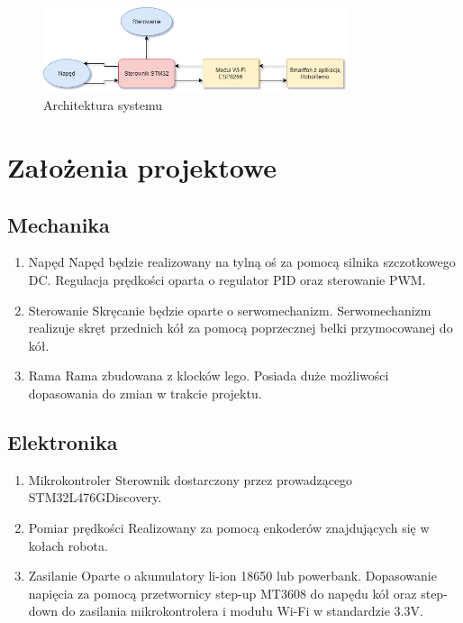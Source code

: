 \documentclass[10pt, a4paper]{article}
\begin{document}
\begin{figure}[H]
	\centering
	\includegraphics[width=0.8\textwidth]{figures/diagram.png}
	\caption{Architektura systemu}
	\label{fig:Architektura}
\end{figure}

\section{Założenia projektowe}

	\subsection{Mechanika}
	\begin{enumerate}
		\item Napęd
		\newline
		Napęd będzie realizowany na tylną oś za pomocą silnika szczotkowego DC. Regulacja prędkości oparta o regulator PID oraz sterowanie PWM.
		
		\item Sterowanie
		\newline
		Skręcanie będzie oparte o serwomechanizm. Serwomechanizm realizuje skręt przednich kół za pomocą poprzecznej belki przymocowanej do kół.
		
		\item Rama
		\newline
		Rama zbudowana z klocków lego. Posiada duże możliwości dopasowania do zmian w trakcie projektu.
	\end{enumerate}

	\subsection{Elektronika}
	\begin{enumerate}
		\item Mikrokontroler
		\newline
		Sterownik dostarczony przez prowadzącego STM32L476GDiscovery.
		
		\item Pomiar prędkości
		\newline
		Realizowany za pomocą enkoderów znajdujących się w kołach robota.
		
		\item Zasilanie
		\newline
		Oparte o akumulatory li-ion 18650 lub powerbank. Dopasowanie napięcia za pomocą przetwornicy step-up MT3608 do napędu kół oraz step-down do zasilania mikrokontrolera i modułu Wi-Fi w standardzie 3.3V.
	\end{enumerate}
\end{document}
